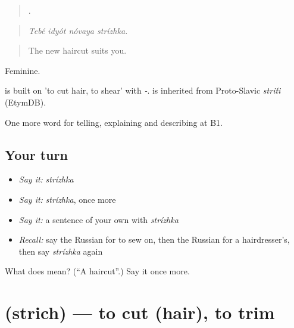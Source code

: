 \begin{quote}
   .
\end{quote}

\begin{quote}
\emph{Tebé idyót nóvaya strízhka.}
\end{quote}

\begin{quote}
The new haircut suits you.
\end{quote}

Feminine.

\begin{cousinweb}
\emph{} is built on \emph{} 'to cut hair, to shear' with \emph{-}. \emph{} is inherited from Proto-Slavic \emph{striťi} (EtymDB).
\end{cousinweb}

\begin{grammarlens}[title={What you've built}]
One more word for telling, explaining and describing at B1.
\end{grammarlens}

\subsection*{Your turn}
\begin{itemize}
\raggedright
  \item \emph{Say it:} \emph{strízhka}
  \item \emph{Say it:} \emph{strízhka}, once more
  \item \emph{Say it:} a sentence of your own with \emph{strízhka}
  \item \emph{Recall:} say the Russian for to sew on, then the Russian for a hairdresser's, then say \emph{strízhka} again
\end{itemize}

\begin{tcolorbox}[breakable,colback=teal!4,colframe=teal!35!black,title={Before you move on}]
What does  mean? (\textquotedblleft{}A haircut\textquotedblright{}.) Say it once more.
\end{tcolorbox}
\section[\texorpdfstring{\ru{стричь} (strich)}{стричь (strich)}]{ (strich) — to cut (hair), to trim}

\label{lesson:RU-C449-strich}



